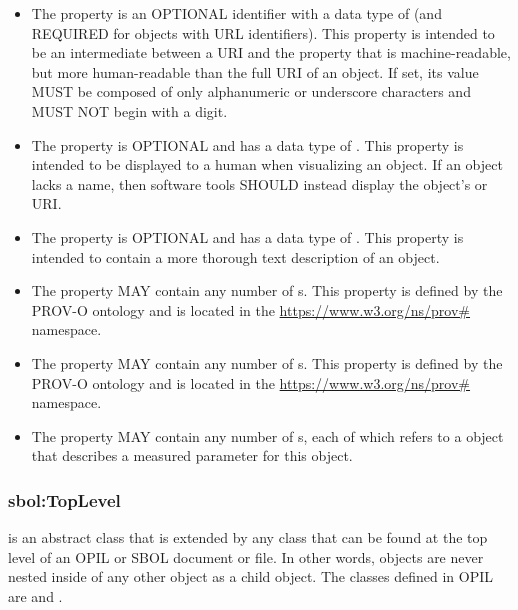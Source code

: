 \begin{itemize}
\item \label{sec:sbol:displayId} 
The  property is an OPTIONAL identifier with a data type of  (and REQUIRED for objects with URL identifiers). This property is intended to be an intermediate between a URI and the  property that is machine-readable, but more human-readable than the full URI of an object.
If set, its  value MUST be composed of only alphanumeric or underscore characters and MUST NOT begin with a digit.

\item \label{sec:sbol:name}
The  property is OPTIONAL and has a data type of . This property is intended to be displayed to a human when visualizing an  object.
If an  object lacks a name, then software tools SHOULD instead display the object's  or URI.

\item \label{sec:sbol:description}
The  property is OPTIONAL and has a data type of . This property is intended to contain a more thorough text description of an  object.

\item \label{sec:prov:wasDerivedFrom}
The  property MAY contain any number of s. This property is defined by the PROV-O ontology and is located in the \url{https://www.w3.org/ns/prov#} namespace.

\item \label{sec:prov:wasGeneratedBy}
The  property MAY contain any number of s. This property is defined by the PROV-O ontology and is located in the \url{https://www.w3.org/ns/prov#} namespace.

\item \label{sec:sbol:hasMeasure}
The  property MAY contain any number of s, each of which refers to a  object that describes a measured parameter for this object.
\end{itemize}

\subsubsection{sbol:TopLevel}
\label{sec:sbol:TopLevel}

 is an abstract class that is extended by any  class that can be found at the top level of an OPIL or SBOL document or file.
In other words,  objects are never nested inside of any other object as a child object.
The  classes defined in OPIL are  and . 

